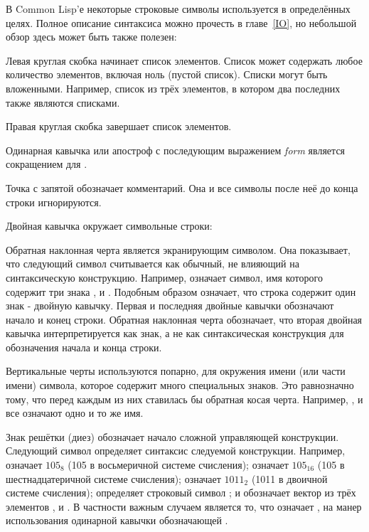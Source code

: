 В Common Lisp'е некоторые строковые символы используется в определённых целях. Полное
описание синтаксиса можно прочесть в главе~\ref{IO}, но небольшой обзор здесь
может быть также полезен:
\begin{indentdesc}{1.2pc}
\item[\cd{(}]
Левая круглая скобка начинает список элементов. Список может содержать любое
количество элементов, включая ноль (пустой список). Списки могут быть
вложенными. Например,  список из трёх элементов, в
котором два последних также являются списками.

\item[\cd{)}] Правая круглая скобка завершает список элементов.

\item[\cd{\Xquote}] Одинарная кавычка или апостроф с последующим выражением
  \emph{form} является сокращением для .

\item[\cd{;}] Точка с запятой обозначает комментарий. Она и все символы после
неё до конца строки игнорируются.

\item[\cd{"}] Двойная кавычка окружает символьные строки: \\

\item[\cd{{\Xbackslash}}] Обратная наклонная черта является экранирующим
символом. Она показывает, что следующий символ считывается как обычный, не
влияющий на синтаксическую конструкцию. Например,  означает
символ, имя которого содержит три знака , \cd{(} и . Подобным
образом   означает, что строка содержит один знак - двойную
кавычку. Первая и последняя двойные кавычки обозначают начало и конец
строки. Обратная наклонная черта обозначает, что вторая двойная кавычка
интерпретируется как знак, а не как синтаксическая конструкция для обозначения
начала и конца строки.

\item[\cd{|}] Вертикальные черты используются попарно, для окружения имени (или
части имени) символа, которое содержит много специальных знаков. Это равнозначно
тому, что перед каждым из них ставилась бы обратная косая
черта. Например, , 
и  все означают одно и то же имя.

\item[\cd{\#}] Знак решётки (диез) обозначает начало сложной управляющей
конструкции. Следующий символ определяет синтаксис следуемой конструкции.
Например,  означает $105_{8}$ (105 в восьмеричной системе счисления);
 означает $105_{16}$ (105 в шестнадцатеричной системе счисления);
 означает $1011_{2}$ (1011 в двоичной системе счисления);
 определяет строковый символ ; и 
обозначает вектор из трёх элементов ,  и . В частности важным
случаем является то, что  означает , на
манер использования одинарной кавычки  обозначающей .


\end{indentdesc}
